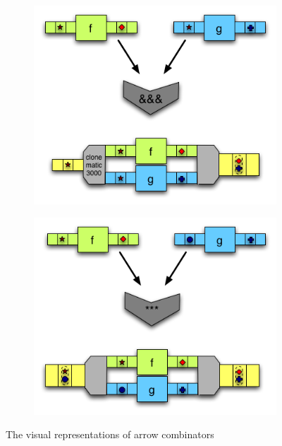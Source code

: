 \begin{figure}
\begin{subfigure}[b]{0.475\textwidth}
      \centering 
      \includegraphics[width=\textwidth]{background/image/ArrowsConveyors_ampersand2.png}
      \caption{\hask{&&&}}
      \label{b:ar:dup}
  \end{subfigure}
  \quad
  \begin{subfigure}[b]{0.475\textwidth}   
      \centering 
      \includegraphics[width=\textwidth]{background/image/ArrowsConveyors_star2.png}
      \caption{\hask{***}}
      \label{b:ar:par}
  \end{subfigure}
  \caption
  {\small The visual representations of arrow combinators\cite{HaskellUnderstandingArrows}}
  \label{b:ar:p1}
\end{figure}

